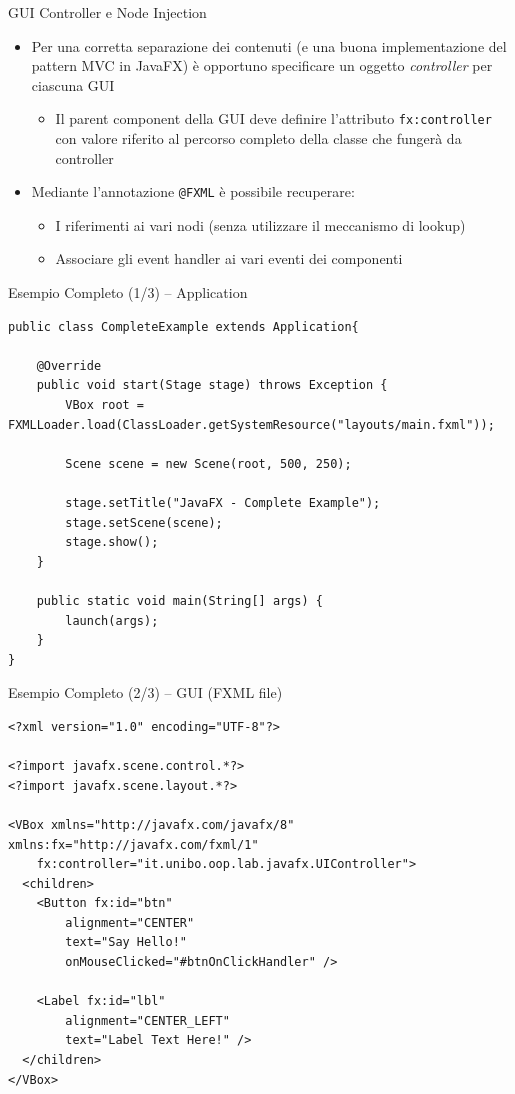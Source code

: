 \documentclass[presentation]{beamer}
\begin{document}
\begin{frame}{GUI Controller e Node Injection}
\begin{itemize}\itemsep20pt
\item Per una corretta separazione dei contenuti (e una buona implementazione del pattern MVC in JavaFX) è opportuno specificare un oggetto \emph{controller} per ciascuna GUI
\begin{itemize}
\item Il parent component della GUI deve definire l'attributo \texttt{fx:controller} con valore riferito al percorso completo della classe che fungerà da controller
\end{itemize}
\item Mediante l'annotazione \texttt{@FXML} è possibile recuperare:
\begin{itemize}
\item I riferimenti ai vari nodi (senza utilizzare il meccanismo di lookup)
\item Associare gli event handler ai vari eventi dei componenti
\end{itemize}
\end{itemize}
\end{frame}

\begin{frame}[fragile]{Esempio Completo (1/3) -- Application}
\begin{lstlisting}
public class CompleteExample extends Application{

	@Override
	public void start(Stage stage) throws Exception {
		VBox root = FXMLLoader.load(ClassLoader.getSystemResource("layouts/main.fxml"));
		
		Scene scene = new Scene(root, 500, 250);
		
		stage.setTitle("JavaFX - Complete Example");
		stage.setScene(scene);
		stage.show();
	}
	
	public static void main(String[] args) {
		launch(args);
	}
}
\end{lstlisting}
\end{frame}

\begin{frame}[fragile]{Esempio Completo (2/3) -- GUI (FXML file)}
\begin{lstlisting}
<?xml version="1.0" encoding="UTF-8"?>

<?import javafx.scene.control.*?>
<?import javafx.scene.layout.*?>

<VBox xmlns="http://javafx.com/javafx/8" xmlns:fx="http://javafx.com/fxml/1"
	fx:controller="it.unibo.oop.lab.javafx.UIController">
  <children>
    <Button fx:id="btn"
    	alignment="CENTER"
    	text="Say Hello!"
    	onMouseClicked="#btnOnClickHandler" />
    
    <Label fx:id="lbl"
    	alignment="CENTER_LEFT"
    	text="Label Text Here!" />
  </children>
</VBox>
\end{lstlisting}
\end{frame}
\end{document}
